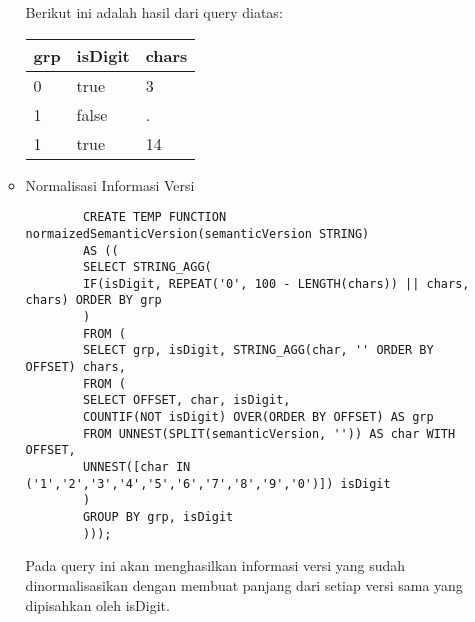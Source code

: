 \begin{enumerate}
\begin{itemize}
		Berikut ini adalah hasil dari query diatas:
			\begin{table}[H]
			\centering
			\begin{tabular}{|l|l|l|}
				\hline
				\textbf{grp} & \textbf{isDigit} & \textbf{chars}\\
				\hline
				0 & true & 3\\
				\hline
				1 & false & .\\
				\hline
				1 & true & 14\\
				\hline
			\end{tabular}
			\label{table:compare_version_step_2}
		\end{table}
		
		\item Normalisasi Informasi Versi
		\begin{lstlisting}
		CREATE TEMP FUNCTION normaizedSemanticVersion(semanticVersion STRING) 
		AS ((
		SELECT STRING_AGG(
		IF(isDigit, REPEAT('0', 100 - LENGTH(chars)) || chars, chars) ORDER BY grp 
		)
		FROM (
		SELECT grp, isDigit, STRING_AGG(char, '' ORDER BY OFFSET) chars,
		FROM (
		SELECT OFFSET, char, isDigit,
		COUNTIF(NOT isDigit) OVER(ORDER BY OFFSET) AS grp
		FROM UNNEST(SPLIT(semanticVersion, '')) AS char WITH OFFSET, 
		UNNEST([char IN ('1','2','3','4','5','6','7','8','9','0')]) isDigit
		)
		GROUP BY grp, isDigit
		)));
		\end{lstlisting}
		Pada query ini akan menghasilkan informasi versi yang sudah dinormalisasikan dengan membuat panjang dari setiap versi sama yang dipisahkan oleh isDigit.
		

\end{itemize}
\end{enumerate}

